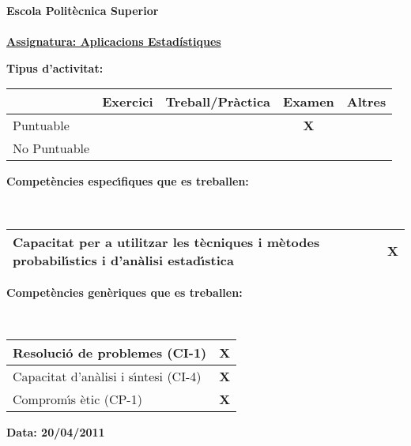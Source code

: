 \documentclass[a4paper,10pt]{article}
\begin{document}
\noindent\textbf{\large{Escola Polit\`ecnica Superior}}\\
\\

\noindent\textbf{\underline{\large{Assignatura: Aplicacions Estad\'{i}stiques}\hspace{10cm}} }\\ 
\noindent\begin{small}\textbf{Tipus d'activitat:}\end{small}
\begin{center}
\begin{tabular}{|l|c|c|c|c|}\hline
 		&Exercici & Treball/Pr\`actica & Examen & Altres \\ \hline
Puntuable       & 	  & 			 & \textbf{X}  	  & \\ \hline
No Puntuable    &  	  &			 & 	  & \\ \hline
\end{tabular}
\end{center}
\noindent\begin{small}\textbf{Compet\`encies espec\'{\i}fiques que es treballen:}\end{small}\\
\begin{tabular}{|l|c|}\hline
Capacitat per a utilitzar les t\`ecniques i m\`etodes probabil\'{\i}stics i d'an\`alisi estad\'{\i}stica & \textbf{X} \\ \hline
\end{tabular}\vspace{0.25cm}

\noindent\begin{small}\textbf{Compet\`encies gen\`eriques que es treballen:}\end{small}\\
\begin{tabular}{|l|c|}\hline
Resoluci\'o de problemes (CI-1) & \textbf{X}\\ \hline
Capacitat d'an\`alisi i s\'{\i}ntesi (CI-4) & \textbf{X}  \\ \hline
Comprom\'{\i}s \`etic (CP-1)$\quad$ & \textbf{X} \\ \hline
\end{tabular}\vspace{0.25cm}

\noindent\begin{small}\textbf{Data: 20/04/2011 }\end{small}\\
\noindent\underline{\hspace{18cm}}
\end{document}

